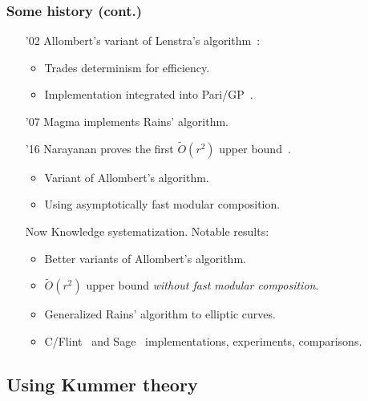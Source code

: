 \documentclass[francais]{beamer}
\def\tildO {\tilde{O}}
\begin{document}
\begin{frame}\frametitle{Some history (cont.)}
  \begin{enumerate}
    \item['02] Allombert's variant of Lenstra's algorithm~\cite{Allombert02,Allombert02-rev}:
      \begin{itemize}
      \item Trades determinism for efficiency.
      \item Implementation integrated into Pari/GP~\cite{Pari}.
      \end{itemize}
    \item['07] Magma implements Rains' algorithm.
    \item['16] Narayanan proves the first $\tildO(r^2)$ upper
      bound~\cite{narayanan2016fast}.
      \begin{itemize}
      \item Variant of Allombert's algorithm.
      \item Using asymptotically fast modular composition.
      \end{itemize}
    \item[Now] Knowledge systematization. Notable results:
      \begin{itemize}
      \item Better variants of Allombert's algorithm.
      \item $\tildO(r^2)$ upper bound \emph{without fast modular
          composition}.
      \item Generalized Rains' algorithm to elliptic curves.
      \item C/Flint~\cite{hart2010flint} and Sage~\cite{Sage} implementations, experiments, comparisons.
      \end{itemize}
    \end{enumerate}
  \end{frame}

\subsection{Using Kummer theory}
\end{document}
